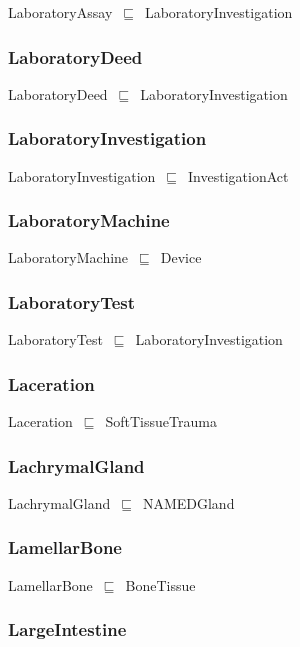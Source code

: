 \documentclass{article}
\begin{document}
LaboratoryAssay~\ensuremath{\sqsubseteq}~LaboratoryInvestigation~

\subsubsection*{LaboratoryDeed}

LaboratoryDeed~\ensuremath{\sqsubseteq}~LaboratoryInvestigation~

\subsubsection*{LaboratoryInvestigation}

LaboratoryInvestigation~\ensuremath{\sqsubseteq}~InvestigationAct~

\subsubsection*{LaboratoryMachine}

LaboratoryMachine~\ensuremath{\sqsubseteq}~Device~

\subsubsection*{LaboratoryTest}

LaboratoryTest~\ensuremath{\sqsubseteq}~LaboratoryInvestigation~

\subsubsection*{Laceration}

Laceration~\ensuremath{\sqsubseteq}~SoftTissueTrauma~

\subsubsection*{LachrymalGland}

LachrymalGland~\ensuremath{\sqsubseteq}~NAMEDGland~

\subsubsection*{LamellarBone}

LamellarBone~\ensuremath{\sqsubseteq}~BoneTissue~

\subsubsection*{LargeIntestine}
\end{document}
